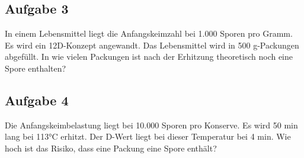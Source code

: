 \documentclass[a4paper,11pt]{article}
\newif\ifshowme
\begin{document}
\subsection*{Aufgabe 3}
In einem Lebensmittel liegt die Anfangskeimzahl bei 1.000 Sporen pro Gramm. Es wird ein 12D-Konzept angewandt. Das Lebensmittel wird in 500 g-Packungen abgefüllt. 
\pp
In wie vielen Packungen ist nach der Erhitzung theoretisch noch eine Spore enthalten?

\ifshowme
\antwort{

Sporen pro Gramm:
\begin{align*}
1000 ~(\text{Sporen} /\text{g}) \cdot 10^{-12} = 10^{-9} ~(\text{Sporen} /\text{g})
\end{align*}
Sporen pro 500 g - Packung:
\begin{align*}
10^{-9} ~(\text{Sporen} /\text{g}) \cdot 500 ~\text{g/Packung} = \frac{1}{2.000.000} ~\text{Sporen/Packung}
\end{align*}
In einer von 2 Millionen Packungen ist noch eine Spore enthalten.
}
\else
\fi


\subsection*{Aufgabe 4}
Die Anfangskeimbelastung liegt bei 10.000 Sporen pro Konserve. Es wird 50 min lang bei
113°C erhitzt. Der D-Wert liegt bei dieser Temperatur bei 4 min. 
\pp 
Wie hoch ist das Risiko, dass eine Packung eine Spore enthält?


\ifshowme
\antwort{
Formel aus Food Processing Handbook, S.35:
\begin{align}
\frac{\text{Heating Time}}{D_T} &= \log(\frac{N_0}{N}) 
\end{align}
Zunächst potenzieren wir um den Logarithmus umstellen zu können:
\begin{align*}
10^{\frac{\text{Heating Time}}{D_T}} &= \frac{N_0}{N} \\
N &= \frac{N_0}{10^{\frac{\text{Heating Time}}{D_T}}}
\end{align*}
Werte einsetzen:
\begin{align*}
N &= \frac{10.000}{10^{\frac{\text{50 ~\text{min}}}{4 ~\text{min}}}} \\
 &= 3,16 \cdot 10^{-9}
\end{align*}
Anzahl der Konserven, die geöffnet werden müssen um eine Spore zu finden:
\begin{align*}
\frac{1}{3,16 \cdot 10^{-9}} = 3,16 \cdot 10^{9}
\end{align*}
}
\else
\fi
\end{document}
